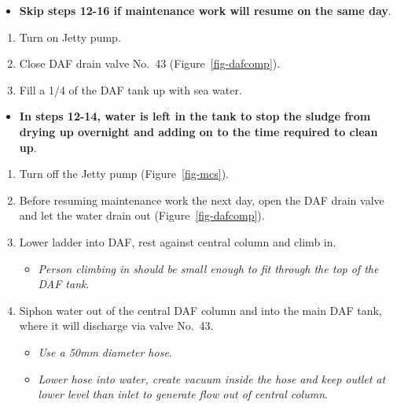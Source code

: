 \documentclass[
  12pt,
]{report}
\providecommand{\tightlist}{%
  \setlength{\itemsep}{0pt}\setlength{\parskip}{0pt}}\usepackage{longtable,booktabs,array}
\begin{document}
\begin{itemize}
\tightlist
\item
  \textbf{Skip steps 12-16 if maintenance work will resume on the same
  day}.
\end{itemize}

\begin{enumerate}
\def\labelenumi{\arabic{enumi}.}
\setcounter{enumi}{11}
\tightlist
\item
  Turn on Jetty pump.
\item
  Close DAF drain valve No.~43 (Figure~\ref{fig-dafcomp}).
\item
  Fill a 1/4 of the DAF tank up with sea water.
\end{enumerate}

\begin{itemize}
\tightlist
\item
  \textbf{In steps 12-14, water is left in the tank to stop the sludge
  from drying up overnight and adding on to the time required to clean
  up}.
\end{itemize}

\begin{enumerate}
\def\labelenumi{\arabic{enumi}.}
\setcounter{enumi}{14}
\tightlist
\item
  Turn off the Jetty pump (Figure~\ref{fig-mcs}).
\item
  Before resuming maintenance work the next day, open the DAF drain
  valve and let the water drain out (Figure~\ref{fig-dafcomp}).
\item
  Lower ladder into DAF, rest against central column and climb in.

  \begin{itemize}
  \tightlist
  \item
    \emph{Person climbing in should be small enough to fit through the
    top of the DAF tank}.
  \end{itemize}
\item
  Siphon water out of the central DAF column and into the main DAF tank,
  where it will discharge via valve No.~43.

  \begin{itemize}
  \tightlist
  \item
    \emph{Use a 50mm diameter hose}.
  \item
    \emph{Lower hose into water, create vacuum inside the hose and keep
    outlet at lower level than inlet to generate flow out of central
    column}.
  \end{itemize}
\end{enumerate}
\end{document}
